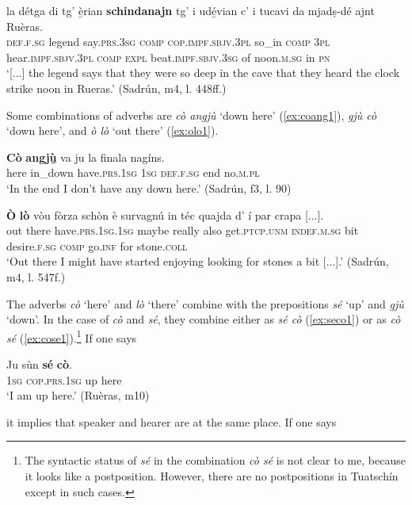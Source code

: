 \ea
\label{ex:schindanajn}
\gll [...] la détga di tg’ è̱rian \textbf{schindanajn} tg' i udé̱vian c’ i tucavi da mjadṣ-dé ajnt Ruèras.\\
{} \textsc{def.f.sg} legend say.\textsc{prs.3sg}  \textsc{comp} \textsc{cop.impf.sbjv.3pl} so\_in \textsc{comp} \textsc{3pl} hear.\textsc{impf.sbjv.3pl} \textsc{comp} \textsc{expl} beat.\textsc{impf.sbjv.3sg} of noon.\textsc{m.sg} in \textsc{pn}\\
\glt `[...] the legend says that they were so deep in the cave that they heard the clock strike noon in Rueras.' (Sadrún, m4, l. 448ff.)
\z

Some combinations of adverbs are \textit{cò angjù} `down here' (\ref{ex:coang1}), \textit{gjù cò} `down here', and \textit{ò lò} `out there' (\ref{ex:olo1}).

\ea
\label{ex:coang1}
\gll  \textbf{Cò} \textbf{angjù̱} va ju la finala nagíns.\\
here in\_down have.\textsc{prs.1sg} \textsc{1sg} \textsc{def.f.sg} end no.\textsc{m.pl}  \\
\glt `In the end I don’t have any down here.' (Sadrún, f3, l. 90)
\z

\ea
\label{ex:olo1}
\gll  \textbf{Ò} \textbf{lò} vòu fòrza schòn è survagnú in téc quajda d' í par crapa [...].\\
out there  have.\textsc{prs.1sg.1sg} maybe really also get.\textsc{ptcp.unm} \textsc{indef.m.sg} bit desire.\textsc{f.sg} \textsc{comp} go.\textsc{inf} for stone.\textsc{coll}\\
\glt `Out there I might have started enjoying looking for stones a bit [...].' (Sadrún, m4, l. 547f.)
\z

The adverbs \textit{cò} `here' and \textit{lò} `there' combine with the prepositions \textit{sé} `up' and \textit{gjù} `down'. In the case of \textit{cò} and \textit{sé}, they combine either as \textit{sé cò} (\ref{ex:seco1}) or as \textit{cò sé} (\ref{ex:cose1}).\footnote{The syntactic status of \textit{sé} in the combination \textit{cò sé} is not clear to me, because it looks like a postposition. However, there are no postpositions in Tuatschín except in such cases.} If one says

\ea
\label{ex:seco1}
\gll Ju sùn \textbf{sé} \textbf{cò}.\\
\textsc{1sg} \textsc{cop.prs.1sg} up here\\
\glt `I am up here.' (Ruèras, m10)
\z

it implies that speaker and hearer are at the same place. If one says

